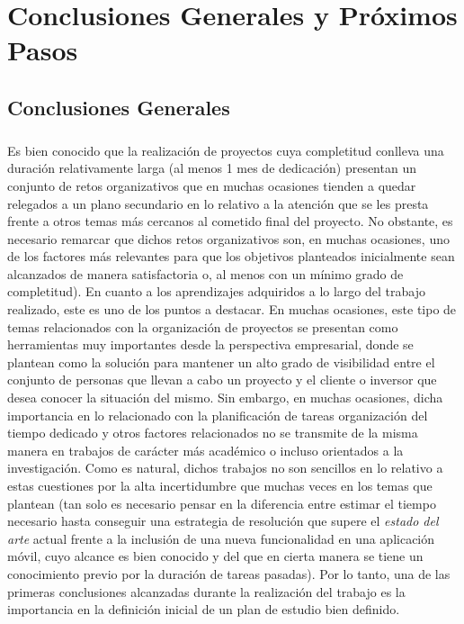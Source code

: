 \documentclass{subfiles}
\begin{document}
  \chapter{Conclusiones Generales y Próximos Pasos}
  \label{chap:conclusions}

    \section{Conclusiones Generales}
    \label{sec:conclusion_general_conclusions}

      \paragraph{}
      Es bien conocido que la realización de proyectos cuya completitud conlleva una duración relativamente larga (al menos 1 mes de dedicación) presentan un conjunto de retos organizativos que en muchas ocasiones tienden a quedar relegados a un plano secundario en lo relativo a la atención que se les presta frente a otros temas más cercanos al cometido final del proyecto. No obstante, es necesario remarcar que dichos retos organizativos son, en muchas ocasiones, uno de los factores más relevantes para que los objetivos planteados inicialmente sean alcanzados de manera satisfactoria o, al menos con un mínimo grado de completitud). En cuanto a los aprendizajes adquiridos a lo largo del trabajo realizado, este es uno de los puntos a destacar. En muchas ocasiones, este tipo de temas relacionados con la organización de proyectos se presentan como herramientas muy importantes desde la perspectiva empresarial, donde se plantean como la solución para mantener un alto grado de visibilidad entre el conjunto de personas que llevan a cabo un proyecto y el cliente o inversor que desea conocer la situación del mismo. Sin embargo, en muchas ocasiones, dicha importancia en lo relacionado con la planificación de tareas organización del tiempo dedicado y otros factores relacionados no se transmite de la misma manera en trabajos de carácter más académico o incluso orientados a la investigación. Como es natural, dichos trabajos no son sencillos en lo relativo a estas cuestiones por la alta incertidumbre que muchas veces en los temas que plantean (tan solo es necesario pensar en la diferencia entre estimar el tiempo necesario hasta conseguir una estrategia de resolución que supere el \emph{estado del arte} actual frente a la inclusión de una nueva funcionalidad en una aplicación móvil, cuyo alcance es bien conocido y del que en cierta manera se tiene un conocimiento previo por la duración de tareas pasadas). Por lo tanto, una de las primeras conclusiones alcanzadas durante la realización del trabajo es la importancia en la definición inicial de un plan de estudio bien definido.
\end{document}
